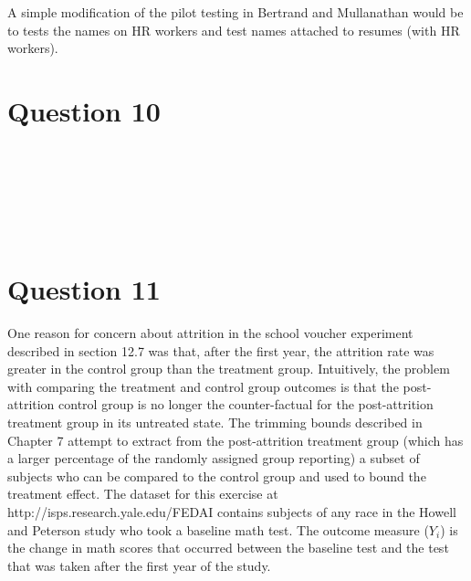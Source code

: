 \documentclass[11pt,notitlepage]{article}\usepackage[]{graphicx}\usepackage[]{color}
\makeatletter
\newenvironment{kframe}{%
 \def\at@end@of@kframe{}%
 \ifinner\ifhmode%
  \def\at@end@of@kframe{\end{minipage}}%
  \begin{minipage}{\columnwidth}%
 \fi\fi%
 \def\FrameCommand##1{\hskip\@totalleftmargin \hskip-\fboxsep
 \colorbox{shadecolor}{##1}\hskip-\fboxsep
     \hskip-\linewidth \hskip-\@totalleftmargin \hskip\columnwidth}%
 \MakeFramed {\advance\hsize-\width
   \@totalleftmargin\z@ \linewidth\hsize
   \@setminipage}}%
 {\par\unskip\endMakeFramed%
 \at@end@of@kframe}
\newenvironment{knitrout}{}{} %
\makeatother
\begin{document}
\begin{enumerate}[a)]
A simple modification of the pilot testing in Bertrand and Mullanathan would be to tests the names on HR workers and test names attached to resumes (with HR workers). 

\end{enumerate}


\section*{Question 10}
\begin{knitrout}
\color{fgcolor}\begin{kframe}
\begin{verbatim}






\end{verbatim}
\end{kframe}
\end{knitrout}



\section*{Question 11}
One reason for concern about attrition in the school voucher experiment described in section 12.7 was that, after the first year, the attrition rate was greater in the control group than the treatment group. Intuitively, the problem with comparing the treatment and control group outcomes is that the post-attrition control group is no longer the counter-factual for the post-attrition treatment group in its untreated state. The trimming bounds described in Chapter 7 attempt to extract from the post-attrition treatment group (which has a larger percentage of the randomly assigned group reporting) a subset of subjects who can be compared to the control group and used to bound the treatment effect. The dataset for this exercise at http://isps.research.yale.edu/FEDAI contains subjects of any race in the Howell and Peterson study who took a baseline math test. The outcome measure ($Y_i$) is the change in math scores that occurred between the baseline test and the test that was taken after the first year of the study.
\end{document}
